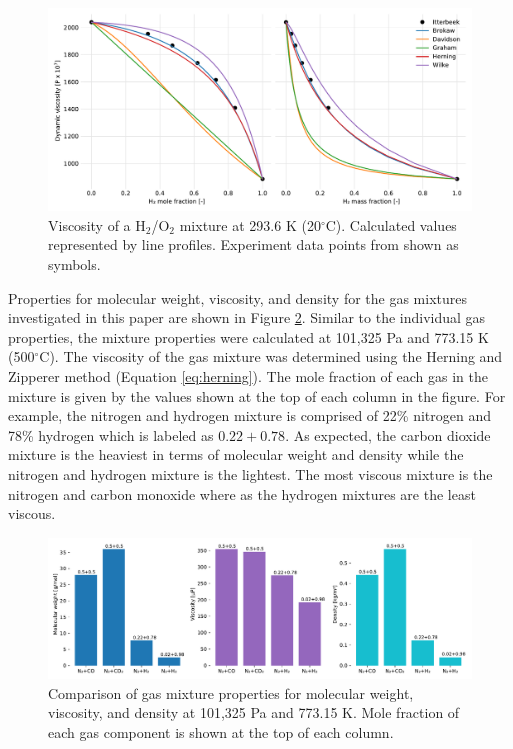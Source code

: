 \documentclass{article}
\begin{document}
\begin{figure}[H]
    \centering
    \includegraphics[width=\textwidth]{figures/gas-mu-h2o2-validate.pdf}
    \caption{Viscosity of a H$_2$/O$_2$ mixture at 293.6 K (20$^\circ$C). Calculated values represented by line profiles. Experiment data points from \cite{Itterbeek-1947} shown as symbols.}
    \label{fig:gas-mu-h2o2-validate}
\end{figure}

Properties for molecular weight, viscosity, and density for the gas mixtures investigated in this paper are shown in Figure \ref{fig:mix-properties}. Similar to the individual gas properties, the mixture properties were calculated at 101,325 Pa and 773.15 K (500$^\circ$C). The viscosity of the gas mixture was determined using the Herning and Zipperer method (Equation \ref{eq:herning}). The mole fraction of each gas in the mixture is given by the values shown at the top of each column in the figure. For example, the nitrogen and hydrogen mixture is comprised of 22\% nitrogen and 78\% hydrogen which is labeled as $0.22 + 0.78$. As expected, the carbon dioxide mixture is the heaviest in terms of molecular weight and density while the nitrogen and hydrogen mixture is the lightest. The most viscous mixture is the nitrogen and carbon monoxide where as the hydrogen mixtures are the least viscous.

\begin{figure}[H]
    \centering
    \includegraphics[width=\textwidth]{mix-properties.pdf}
    \caption{Comparison of gas mixture properties for molecular weight, viscosity, and density at 101,325 Pa and 773.15 K. Mole fraction of each gas component is shown at the top of each column.}
    \label{fig:mix-properties}
\end{figure}
\end{document}

